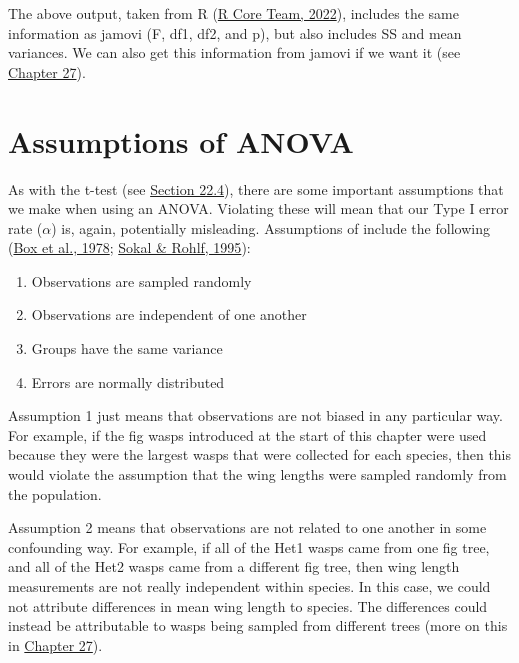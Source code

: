 \documentclass[
  openany]{krantz}
\providecommand{\tightlist}{%
  \setlength{\itemsep}{0pt}\setlength{\parskip}{0pt}}
\begin{document}
The above output, taken from R (\protect\hyperlink{ref-Rproject}{R Core Team, 2022}), includes the same information as jamovi (F, df1, df2, and p), but also includes SS and mean variances.
We can also get this information from jamovi if we want it (see \protect\hyperlink{Chapter_27}{Chapter 27}).

\hypertarget{assumptions-of-anova}{%
\section{Assumptions of ANOVA}\label{assumptions-of-anova}}

As with the t-test (see \protect\hyperlink{assumptions-of-t-tests}{Section 22.4}), there are some important assumptions that we make when using an ANOVA.
Violating these  will mean that our Type I error rate (\(\alpha\)) is, again, potentially misleading.
Assumptions of  include the following (\protect\hyperlink{ref-Box1978}{Box et al., 1978}; \protect\hyperlink{ref-Sokal1995}{Sokal \& Rohlf, 1995}):

\begin{enumerate}
\def\labelenumi{\arabic{enumi}.}
\tightlist
\item
  Observations are sampled randomly
\item
  Observations are independent of one another
\item
  Groups have the same variance
\item
  Errors are normally distributed
\end{enumerate}

Assumption 1 just means that observations are not biased in any particular way.
For example, if the fig wasps introduced at the start of this chapter were used because they were the largest wasps that were collected for each species, then this would violate the assumption that the wing lengths were sampled randomly from the population.

Assumption 2 means that observations are not related to one another in some confounding way.
For example, if all of the Het1 wasps came from one fig tree, and all of the Het2 wasps came from a different fig tree, then wing length measurements are not really independent within species.
In this case, we could not attribute differences in mean wing length to species.
The differences could instead be attributable to wasps being sampled from different trees (more on this in \protect\hyperlink{Chapter_27}{Chapter 27}).
\end{document}
